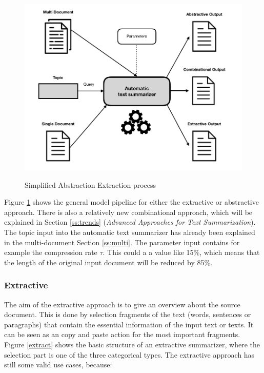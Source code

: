 \begin{figure}
	\begin{center}
		\includegraphics[width=5in]{photos/abex}\\
		\caption{Simplified Abstraction Extraction process}\label{abex}
	\end{center}
\end{figure}

Figure \ref{abex} shows the general model pipeline for either the extractive or abstractive approach. There is also a relatively new combinational approach, which will be explained in Section \ref{ss:trends} (\textit{Advanced Approaches for Text Summarization}). The topic input into the automatic text summarizer has already been explained in the multi-document Section \ref{ss:multi}. The parameter input contains for example the compression rate \(\tau\). This could a a value like 15\%, which means that the length of the original input document will be reduced by 85\%.

\subsubsection{Extractive}\label{ss:extractive}
	
The aim of the extractive approach is to give an overview about the source document. This is done by selection fragments of the text (words, sentences or paragraphs) that contain the essential information of the input text or texts. It can be seen as an copy and paste action for the most important fragments. Figure \ref{extract} shows the basic structure of an extractive summarizer, where the selection part is one of the three categorical types. The extractive approach has still some valid use cases, because:

